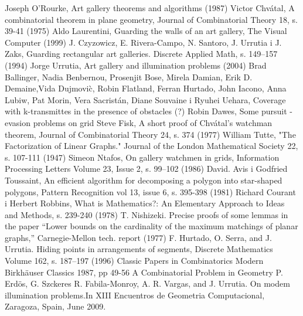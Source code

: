 \documentclass[brudnopis]{xmgr}
\theoremstyle{definition}
\begin{document}
\begin{bibdiv}
\begin{biblist}
  Joseph O'Rourke, Art gallery theorems and algorithms (1987)
  Victor Chv\'atal, A combinatorial theorem in plane geometry, Journal of Combinatorial Theory 18, s. 39-41 (1975)
  Aldo Laurentini, Guarding the walls of an art gallery, The Visual Computer (1999)
  J. Czyzowicz, E. Rivera-Campo, N. Santoro, J. Urrutia i J. Zaks, Guarding rectangular art galleries. Discrete Applied Math, s. 149–157 (1994)
  Jorge Urrutia, Art gallery and illumination problems (2004)
  Brad Ballinger, Nadia Benbernou, Prosenjit Bose, Mirela Damian, Erik D. Demaine,Vida Dujmovi\`c, Robin Flatland, Ferran Hurtado, John Iacono, Anna Lubiw, Pat Morin, Vera Sacristán, Diane Souvaine i Ryuhei Uehara, Coverage with k-transmittes in the presence of obstacles (?)
  Robin Dawes, Some pursuit - evasion problems on grid
  Steve Fisk, A short proof of Chv\'atal's watchman theorem, Journal of Combinatorial Theory 24, s. 374 (1977)
  William Tutte, "The Factorization of Linear Graphs." Journal of the London Mathematical Society 22, s. 107-111 (1947)
  Simeon Ntafos, On gallery watchmen in grids, Information Processing Letters Volume 23, Issue 2, s. 99–102 (1986)
  David. Avis i Godfried Toussaint, An efficient algorithm for decomposing a polygon into star-shaped polygons, Pattern Recognition vol 13, issue 6, s. 395-398 (1981)
  Richard Courant i Herbert Robbins, What is Mathematics?: An Elementary Approach to Ideas and Methods, s. 239-240 (1978)
  T. Nishizeki. Precise proofs of some lemmas in the paper “Lower bounds on the cardinality of the maximum matchings of planar graphs,” Carnegie-Mellon tech. report (1977)
   F. Hurtado, O. Serra, and J. Urrutia. Hiding points in arrangements of segments, Discrete Mathematics Volume 162, s. 187–197  (1996)
  Classic Papers in Combinatorics Modern Birkhäuser Classics 1987, pp 49-56 A Combinatorial Problem in Geometry P. Erdös, G. Szckeres
  R. Fabila-Monroy, A. R. Vargas, and J. Urrutia. On modem illumination problems.In XIII Encuentros de Geometria Computacional, Zaragoza, Spain, June 2009.

\end{biblist}
\end{bibdiv}
\end{document}
